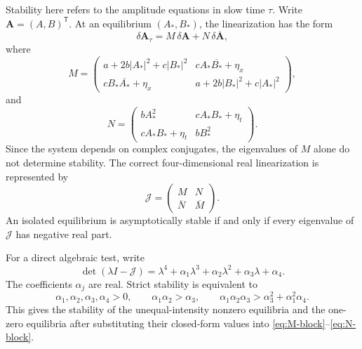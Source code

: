 Stability here refers to the amplitude equations in slow time $\tau$.  Write
$\mathbf A=(A,B)^\mathsf{T}$.  At an equilibrium $(A_*,B_*)$, the
linearization has
the form
\begin{equation}
 \delta\mathbf A_\tau
 =M\,\delta\mathbf A+N\,\delta\overline{\mathbf A},
 \label{eq:complex-linearization}
\end{equation}
where
\begin{equation}
 M=
 \begin{pmatrix}
  a+2b|A_*|^2+c|B_*|^2&cA_*\overline{B_*}+\eta_x\\
  cB_*\overline{A_*}+\eta_x&a+2b|B_*|^2+c|A_*|^2
 \end{pmatrix},
 \label{eq:M-block}
\end{equation}
and
\begin{equation}
 N=
 \begin{pmatrix}
  bA_*^2&cA_*B_*+\eta_t\\
  cA_*B_*+\eta_t&bB_*^2
 \end{pmatrix}.
 \label{eq:N-block}
\end{equation}
Since the system depends on complex conjugates, the eigenvalues of $M$ alone
do not determine stability.  The correct four-dimensional real
linearization is represented by
\begin{equation}
 \mathcal J=
 \begin{pmatrix}
  M&N\\
  \overline N&\overline M
 \end{pmatrix}.
 \label{eq:doubled-Jacobian}
\end{equation}
An isolated equilibrium is asymptotically stable if and only if every
eigenvalue of $\mathcal J$ has negative real part.

For a direct algebraic test, write
\begin{equation}
 \det(\lambda I-\mathcal J)
 =\lambda^4+\alpha_1\lambda^3+\alpha_2\lambda^2
  +\alpha_3\lambda+\alpha_4.
 \label{eq:quartic-characteristic}
\end{equation}
The coefficients $\alpha_j$ are real.  Strict stability is equivalent to
\begin{equation}
 \alpha_1,\alpha_2,\alpha_3,\alpha_4>0,
 \qquad
 \alpha_1\alpha_2>\alpha_3,
 \qquad
 \alpha_1\alpha_2\alpha_3>
 \alpha_3^2+\alpha_1^2\alpha_4.
 \label{eq:quartic-Hurwitz}
\end{equation}
This gives the stability of the unequal-intensity nonzero equilibria and the
one-zero equilibria after substituting their closed-form values into
\eqref{eq:M-block}--\eqref{eq:N-block}.

